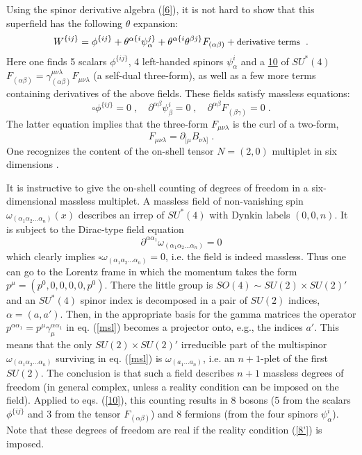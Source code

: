 \documentclass[a4paper,12pt]{article}
\begin{document}
Using the spinor derivative algebra (\ref{6}), it is not hard to 
show that this superfield has the following $\theta$ expansion: 
\begin{equation}\label{9}
  W^{\{ij\}} = \phi^{\{ij\}} + \theta^{\alpha\{i}\psi^{j\}}_\alpha 
+ \theta^{\alpha\{i} \theta^{\beta j\}} F_{(\alpha\beta)} + 
\mbox{\small derivative terms }\;. 
\end{equation}
Here one finds 5 scalars $\phi^{\{ij\}}$, 4 left-handed spinors 
$\psi^i_\alpha$ and a  \underline{10} of $SU^*(4)$ 
$F_{(\alpha\beta)} = \gamma^{\mu\nu\lambda}_{(\alpha\beta)} 
F_{\mu\nu\lambda}$ (a self-dual three-form), as well as a few more 
terms containing derivatives of the above fields. These fields 
satisfy massless equations: 
\begin{equation}\label{10}
  \square\phi^{\{ij\}} = 0\;, \quad 
\partial^{\alpha\beta}\psi^i_\beta = 0\;, \quad 
\partial^{\alpha\beta} F_{(\beta\gamma)}=0\;.
\end{equation}
The latter equation implies that the three-form 
$F_{\mu\nu\lambda}$ is the curl of a two-form,
\begin{equation}\label{11}
  F_{\mu\nu\lambda} = \partial_{[\mu}B_{\nu\lambda]}\;.
\end{equation}
One recognizes the content of the on-shell tensor $N=(2,0)$ 
multiplet in six dimensions \cite{HSiT,bsvp}. 


It is instructive to give the on-shell counting of degrees of 
freedom in a  six-dimensional massless multiplet. A massless field 
of non-vanishing spin 
$\omega_{(\alpha_1\alpha_2\ldots\alpha_n)}(x)$ describes an irrep 
of $SU^*(4)$ with Dynkin labels $(0,0,n)$. It is subject to the 
Dirac-type field equation 
\begin{equation}\label{msl}
  \partial^{\alpha\alpha_1} 
\omega_{(\alpha_1\alpha_2\ldots\alpha_n)} = 0
\end{equation}
which clearly implies 
$\square\omega_{(\alpha_1\alpha_2\ldots\alpha_n)} = 0$, i.e. the 
field is indeed massless. Thus one can go to the Lorentz frame in 
which the momentum takes the form $p^\mu=(p^0,0,0,0,0,p^0)$. There 
the little group is $SO(4)\sim SU(2)\times SU(2)'$ and an  
$SU^*(4)$ spinor index is decomposed in a pair of $SU(2)$ indices, 
$\alpha = (a,a')$. Then, in the appropriate basis for the gamma 
matrices the operator $p^{\alpha\alpha_1} = 
p^\mu\gamma^{\alpha\alpha_1}_\mu $ in eq. (\ref{msl}) becomes a 
projector onto, e.g., the indices $a'$. This means that the only 
$SU(2)\times SU(2)'$ irreducible part of the multispinor 
$\omega_{(\alpha_1\alpha_2\ldots\alpha_n)}$ surviving in eq. 
(\ref{msl}) is $\omega_{(a_1\ldots a_n)}$, i.e. an $n+1$-plet of 
the first $SU(2)$. The conclusion is that such a field describes 
$n+1$ massless degrees of freedom (in general complex, unless a 
reality condition can be imposed on the field). Applied to eqs. 
(\ref{10}), this counting results in 8 bosons (5 from the scalars 
$\phi^{\{ij\}}$ and 3 from the tensor $F_{(\alpha\beta)}$) and 8 
fermions (from the four spinors $\psi^i_\alpha$). Note that these 
degrees of freedom are real if the reality condition (\ref{8'}) is 
imposed. 
\end{document}
